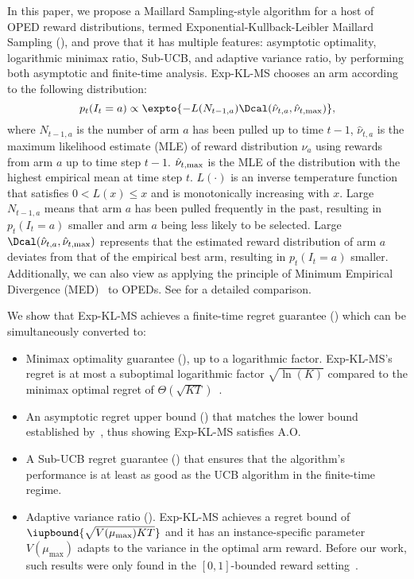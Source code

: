     In this paper, we propose a Maillard Sampling-style algorithm for a host of OPED reward distributions, termed Exponential-Kullback-Leibler Maillard Sampling (\expklms), and prove that it has multiple features: asymptotic optimality, logarithmic minimax ratio, Sub-UCB, and adaptive variance ratio, by performing both asymptotic and finite-time analysis. 
    Exp-KL-MS chooses an arm according to the following distribution:
    \begin{equation}
        p_t(I_t=a) \propto \expto{ -L(N_{t-1,a}) \Dcal(\hat{\nu}_{t, a}, \hat{\nu}_{t, \max})},
        \label{eqn:exp-kl-ms}
    \end{equation}
    where $N_{t-1, a}$ is the number of arm $a$ has been pulled up to time $t-1$, 
    $\hat{\nu}_{t, a}$ is the maximum likelihood estimate (MLE) of reward distribution $\nu_a$ using rewards from arm $a$ up to time step $t-1$.
    ${\hat\nu}_{t, \max}$ is the MLE of the distribution with the highest empirical mean at time step $t$.
    $L(\cdot)$ is an inverse temperature function that satisfies $0 < L(x) \leq x$ and is monotonically increasing with $x$. 
    Large $N_{t-1, a}$ means that arm $a$ has been pulled frequently in the past, resulting in $p_t(I_t=a)$ smaller and arm $a$ being less likely to be selected.
    Large $\Dcal(\hnu_{t, a}, \hnu_{t, \max})$ represents that the estimated reward distribution of arm $a$ deviates from that of the empirical best arm, resulting in $p_t(I_t=a)$ smaller. 
    Additionally, we can also view \expklms as applying the principle of Minimum Empirical Divergence (MED)~\citep{honda2011asymptotically} to OPEDs. 
    See  for a detailed comparison.

    We show that Exp-KL-MS achieves a finite-time regret guarantee () which can be simultaneously converted to:
    \begin{itemize}
        \item Minimax optimality guarantee (), up to a logarithmic factor. Exp-KL-MS's regret is at most a suboptimal logarithmic factor $\sqrt{\ln(K)}$ compared to the minimax optimal regret of $\Theta(\sqrt{KT})$~\citep{audibert09minimax,auer03nonstochastic}.
        \item An asymptotic regret upper bound () that matches the lower bound established by~\citet{lai85asymptotically}, thus showing Exp-KL-MS satisfies A.O.
        \item A Sub-UCB regret guarantee () that ensures that the algorithm's performance is at least as good as the UCB algorithm in the finite-time regime.
        \item Adaptive variance ratio (). Exp-KL-MS achieves a regret bound of $\iupbound{\sqrt{V(\mu_{\max}) KT}}$ and it has an instance-specific parameter $V(\mu_{\max})$ adapts to the variance in the optimal arm reward.    
        Before our work, such results were only found in the $[0,1]$-bounded reward setting~\citep{qin2023kullback}.
    \end{itemize}


